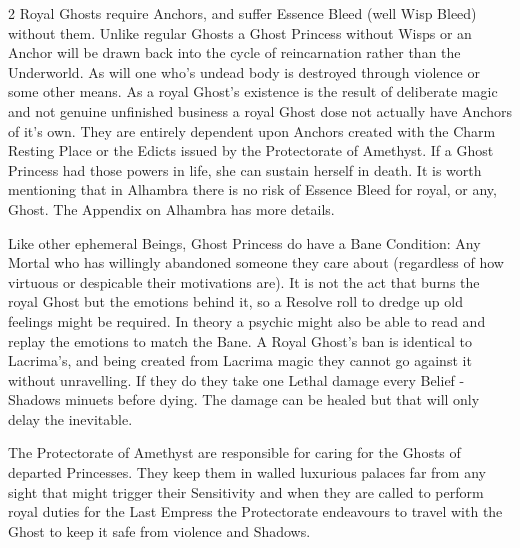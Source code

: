 \begin{multicols}{2}
Royal Ghosts require Anchors, and suffer Essence Bleed (well Wisp Bleed) without them. Unlike regular Ghosts a Ghost Princess without Wisps or an Anchor will be drawn back into the cycle of reincarnation rather than the Underworld. As will one who's undead body is destroyed through violence or some other means. As a royal Ghost's existence is the result of deliberate magic and not genuine unfinished business a royal Ghost dose not actually have Anchors of it's own. They are entirely dependent upon Anchors created with the Charm Resting Place or the Edicts issued by the Protectorate of Amethyst. If a Ghost Princess had those powers in life, she can sustain herself in death. It is worth mentioning that in Alhambra there is no risk of Essence Bleed for royal, or any, Ghost. The Appendix on Alhambra has more details. 

Like other ephemeral Beings, Ghost Princess do have a Bane Condition: Any Mortal who has willingly abandoned someone they care about (regardless of how virtuous or despicable their motivations are). It is not the act that burns the royal Ghost but the emotions behind it, so a Resolve roll to dredge up old feelings might be required. In theory a psychic might also be able to read and replay the emotions to match the Bane. A Royal Ghost's ban is identical to Lacrima's, and being created from Lacrima magic they cannot go against it without unravelling. If they do they take one Lethal damage every Belief - Shadows minuets before dying. The damage can be healed but that will only delay the inevitable.

The Protectorate of Amethyst are responsible for caring for the Ghosts of departed Princesses. They keep them in walled luxurious palaces far from any sight that might trigger their Sensitivity and when they are called to perform royal duties for the Last Empress the Protectorate endeavours to travel with the Ghost to keep it safe from violence and Shadows. 


\end{multicols}\newpage{}
